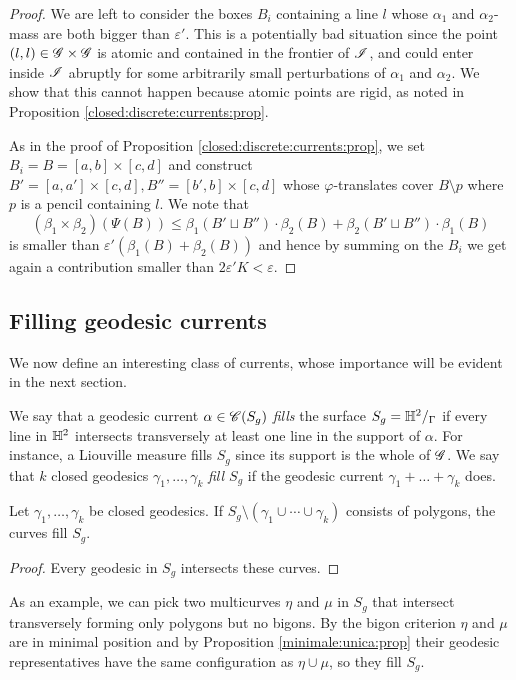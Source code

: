 \begin{proof}
We are left to consider the boxes $B_i$ containing a line $l$ whose $\alpha_1$ and $\alpha_2$-mass are both bigger than $\varepsilon'$. This is a potentially bad situation since the point $(l,l) \in \mathscr{G}\times \mathscr{G}$ is atomic and contained in the frontier of $\mathscr{I}$, and could enter inside $\mathscr{I}$ abruptly for some arbitrarily small perturbations of $\alpha_1$ and $\alpha_2$. We show that this cannot happen because atomic points are rigid, as noted in Proposition \ref{closed:discrete:currents:prop}.

As in the proof of Proposition \ref{closed:discrete:currents:prop}, we set $B_i = B = [a,b] \times [c,d]$ and construct $B' = [a,a'] \times [c,d], B'' = [b',b] \times [c,d]$ whose $\varphi$-translates cover $B\setminus p$ where $p$ is a pencil containing $l$. We note that
$$(\beta_1 \times \beta_2) (\Psi(B)) \leqslant \beta_1(B' \sqcup B'') \cdot \beta_2(B) + \beta_2(B'\sqcup B'') \cdot \beta_1(B)$$
is smaller than $\varepsilon' (\beta_1(B) + \beta_2(B))$ and hence by summing on the $B_i$ we get again a contribution smaller than $2\varepsilon' K < \varepsilon$.
\end{proof}

\subsection{Filling geodesic currents}
We now define an interesting class of currents, whose importance will be evident in the next section.

We say that a geodesic current $\alpha\in\mathscr{C}(S_g)$ \emph{fills} the surface $S_g=\mathbb{H}^2/_\Gamma$ if every line in $\mathbb{H}^2$ intersects transversely at least one line in the support of $\alpha$. For instance, a Liouville measure fills $S_g$ since its support is the whole of $\mathscr{G}$. We say that $k$ closed geodesics $\gamma_1,\ldots, \gamma_k$ \emph{fill $S_g$} if the geodesic current $\gamma_1+\ldots + \gamma_k$ does.

\begin{prop}
Let $\gamma_1,\ldots, \gamma_k$ be closed geodesics. If $S_g \setminus (\gamma_1\cup \cdots\cup \gamma_k)$ consists of polygons, the curves fill $S_g$.
\end{prop}
\begin{proof}
Every geodesic in $S_g$ intersects these curves.
\end{proof}

As an example, we can pick two multicurves $\eta$ and $\mu$ in $S_g$ that intersect transversely forming only polygons but no bigons. By the bigon criterion $\eta$ and $\mu$ are in minimal position and by Proposition \ref{minimale:unica:prop} their geodesic representatives have the same configuration as $\eta\cup\mu$, so they fill $S_g$.

